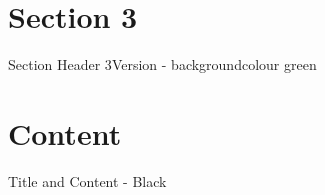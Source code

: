 \documentclass[10pt]{beamer} %
\begin{document}
\section{Section 3}
{\sectionheaderGreen %
\begin{frame}{Section Header 3}{Version - backgroundcolour green}
\end{frame}
}

\section{Content}
{\blackSlide %
\begin{frame}{Title and Content - Black}
\begin{columns}
  \begin{column}{0.3\textwidth}
    \begin{center}

\end{center}
\end{column}
\end{columns}
\end{frame}}
\end{document}
